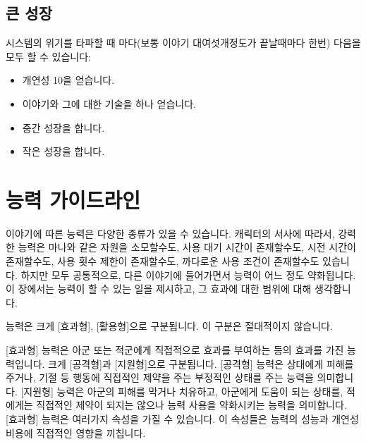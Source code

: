 \documentclass[12pt]{report}
\begin{document}
	\section*{큰 성장}
	시스템의 위기를 타파할 때 마다(보통 이야기 대여섯개정도가 끝날때마다 한번) 다음을 모두 할 수 있습니다:
	\begin{itemize}
		\item 개연성 10을 얻습니다.
		\item 이야기와 그에 대한 기술을 하나 얻습니다.
		\item 중간 성장을 합니다.
		\item 작은 성장을 합니다.
	\end{itemize}
	
	\chapter{능력 가이드라인}\label{능력_가이드라인}
	이야기에 따른 능력은 다양한 종류가 있을 수 있습니다.
	캐릭터의 서사에 따라서, 강력한 능력은 마나와 같은 자원을 소모할수도, 사용 대기 시간이 존재할수도, 시전 시간이 존재할수도, 사용 횟수 제한이 존재할수도, 까다로운 사용 조건이 존재할수도 있습니다. 하지만 모두 공통적으로, 다른 이야기에 들어가면서 능력이 어느 정도 약화됩니다.
	이 장에서는 능력이 할 수 있는 일을 제시하고, 그 효과에 대한 범위에 대해 생각합니다.
	
	능력은 크게 [효과형], [활용형]으로 구분됩니다. 이 구분은 절대적이지 않습니다.
	
	[효과형] 능력은 아군 또는 적군에게 직접적으로 효과를 부여하는 등의 효과를 가진 능력입니다. 크게 [공격형]과 [지원형]으로 구분됩니다.
	[공격형] 능력은 상대에게 피해를 주거나, 기절 등 행동에 직접적인 제약을 주는 부정적인 상태를 주는 능력을 의미합니다.
	[지원형] 능력은 아군의 피해를 막거나 치유하고, 아군에게 도움이 되는 상태를, 적에게는 직접적인 제약이 되지는 않으나 능력 사용을 약화시키는 능력을 의미합니다.
	[효과형] 능력은 여러가지 속성을 가질 수 있습니다. 이 속성들은 능력의 성능과 개연성 비용에 직접적인 영향을 끼칩니다.
	
\end{document}
